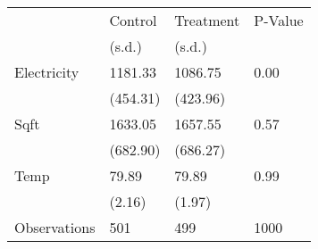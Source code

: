 \begin{tabular}{llll}
\toprule
 & Control & Treatment & P-Value \\
 & (s.d.) & (s.d.) &   \\
\midrule
Electricity & 1181.33 & 1086.75 & 0.00 \\
  & (454.31) & (423.96) &  \\
Sqft & 1633.05 & 1657.55 & 0.57 \\
  & (682.90) & (686.27) &  \\
Temp & 79.89 & 79.89 & 0.99 \\
  & (2.16) & (1.97) &  \\
Observations & 501 & 499 & 1000 \\
\bottomrule
\end{tabular}
